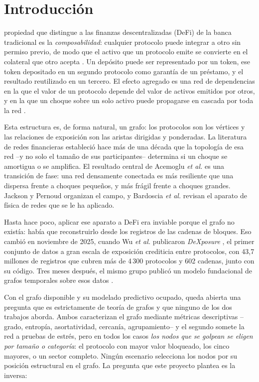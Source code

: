 \documentclass[journal]{IEEEtran}
\begin{document}
\section{Introducción}

 propiedad que distingue a las finanzas descentralizadas
(DeFi) de la banca tradicional es la \emph{composabilidad}: cualquier protocolo
puede integrar a otro sin permiso previo, de modo que el activo que un protocolo
emite se convierte en el colateral que otro acepta \cite{capponi2023defi}. Un
depósito puede ser representado por un token, ese token depositado en un segundo
protocolo como garantía de un préstamo, y el resultado reutilizado en un tercero.
El efecto agregado es una red de dependencias en la que el valor de un protocolo
depende del valor de activos emitidos por otros, y en la que un choque sobre un
solo activo puede propagarse en cascada por toda la red \cite{shu2026dexposurefm}.

Esta estructura es, de forma natural, un grafo: los protocolos son los vértices y
las relaciones de exposición son las aristas dirigidas y ponderadas. La literatura
de redes financieras estableció hace más de una década que la topología de esa red
--y no solo el tamaño de sus participantes-- determina si un choque se amortigua o
se amplifica. El resultado central de Acemoglu \emph{et al.}
\cite{acemoglu2015systemic} es una transición de fase: una red densamente conectada
es más resiliente que una dispersa frente a choques pequeños, y más frágil frente a
choques grandes. Jackson y Pernoud \cite{jackson2020survey} organizan el campo, y
Bardoscia \emph{et al.} \cite{bardoscia2021physics} revisan el aparato de física de
redes que se le ha aplicado.

Hasta hace poco, aplicar ese aparato a DeFi era inviable porque el grafo no
existía: había que reconstruirlo desde los registros de las cadenas de bloques.
Eso cambió en noviembre de 2025, cuando Wu \emph{et al.} publicaron
\emph{DeXposure} \cite{wu2025dexposure}, el primer conjunto de datos a gran escala
de exposición crediticia entre protocolos, con 43{,}7 millones de registros que
cubren más de 4\,300 protocolos y 602 cadenas, junto con su código. Tres meses
después, el mismo grupo publicó un modelo fundacional de grafos temporales sobre
esos datos \cite{shu2026dexposurefm}.

Con el grafo disponible y su modelado predictivo ocupado, queda abierta una
pregunta que es estrictamente de teoría de grafos y que ninguno de los dos
trabajos aborda. Ambos caracterizan el grafo mediante métricas descriptivas
--grado, entropía, asortatividad, cercanía, agrupamiento-- y el segundo somete la
red a pruebas de estrés, pero en todos los casos \emph{los nodos que se golpean se
eligen por tamaño o categoría}: el protocolo con mayor valor bloqueado, los cinco mayores,
o un sector completo. Ningún escenario selecciona los nodos por su posición
estructural en el grafo. La pregunta que este proyecto plantea es la inversa:
\end{document}
